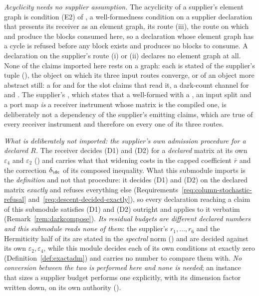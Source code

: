 \begin{remark}
\emph{Acyclicity needs no supplier assumption.} The acyclicity of a supplier's element graph is
condition (E2) of , a well-formedness condition on a
supplier declaration that presents its receiver as an element graph, its
route (iii), the route on which 
and  produce
the blocks consumed here, so a declaration whose element graph has a cycle is
refused before any block exists and produces no blocks to consume. A
declaration on the supplier's route (i) or (ii) declares no element graph at
all. None of the claims imported here rests on a graph: each is stated of the
supplier's  tuple (),
the object on which its three input routes converge, or of an object more
abstract still: a  for 
and for the slot claims that read it, a dark-count channel for
 and
. The supplier's
, which states that a well-formed
 with a , an input
split and a port map \emph{is} a receiver instrument whose matrix is the
compiled one, is deliberately not a dependency of the supplier's emitting
claims, which are true of every receiver instrument and therefore on every one
of its three routes.

\emph{What is deliberately not imported: the supplier's own admission
procedure for a declared $R$.} The receiver decides (D1) and (D2) for a
\emph{declared} matrix at its own  $\varepsilon_4$
and $\varepsilon_2$ () and
carries what that widening costs in the capped coefficient $\bar r$ and the
correction $\delta_{\dc}$ of its composed inequality. What this submodule
imports is the \emph{definition} and not that procedure: it decides (D1) and
(D2) on the declared matrix \emph{exactly} and refuses everything else
(Requirements~\ref{req:column-stochastic-refusal}
and~\ref{req:descent-decided-exactly}), so every declaration reaching a claim
of this submodule satisfies (D1) and (D2) outright and
 applies to it verbatim
(Remark~\ref{rem:darkcompose}). \emph{Its residual budgets are different
declared numbers and this submodule reads none of them}: the supplier's
$r_1,\dots,r_6$ and the Hermiticity half of its
 are stated in the \emph{spectral}
norm () and are decided
against its own $\varepsilon_2,\varepsilon_4$, while this module decides each
of its own conditions at exactly zero (Definition~\ref{def:exactadm}) and
carries no number to compare them with. \emph{No conversion between the two is
performed here and none is needed}; an instance that sizes a supplier budget
performs one explicitly, with its dimension factor written down, on its own
authority ().
\end{remark}
